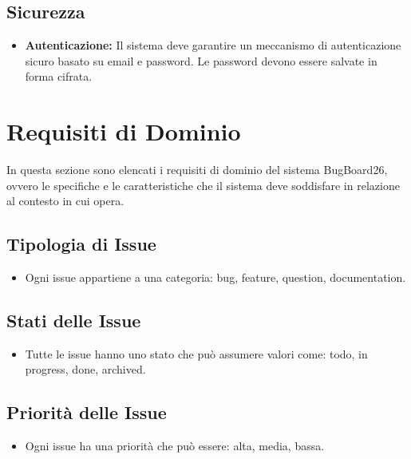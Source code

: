 \subsection{Sicurezza}
\begin{itemize}
    \item \textbf{Autenticazione:} Il sistema deve garantire un meccanismo di autenticazione sicuro basato su email e password. Le password devono essere salvate in forma cifrata.
\end{itemize}






\newpage

\section{Requisiti di Dominio}
In questa sezione sono elencati i requisiti di dominio del sistema BugBoard26, ovvero le specifiche e le caratteristiche che il sistema deve soddisfare in relazione al contesto in cui opera.
\subsection{Tipologia di Issue}
\begin{itemize}
    \item Ogni issue appartiene a una categoria: bug, feature, question, documentation.
\end{itemize}

\subsection{Stati delle Issue}
\begin{itemize}
    \item Tutte le issue hanno uno stato che può assumere valori come: todo, in progress, done, archived.
\end{itemize}

\subsection{Priorità delle Issue}
\begin{itemize}
    \item Ogni issue ha una priorità che può essere: alta, media, bassa.
\end{itemize}